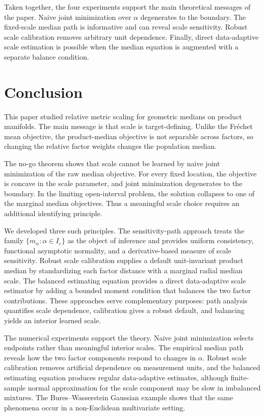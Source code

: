 \documentclass[11pt]{article}
\newcommand{\eps}{\varepsilon}
\newcommand{\1}{\mathbf{1}}
\begin{document}
Taken together, the four experiments support the main theoretical messages of
the paper.  Naive joint minimization over $\alpha$ degenerates to the boundary.
The fixed-scale median path is informative and can reveal scale sensitivity.
Robust scale calibration removes arbitrary unit dependence.  Finally, direct
data-adaptive scale estimation is possible when the median equation is
augmented with a separate balance condition.

\section{Conclusion}\label{sec:conclusion}

This paper studied relative metric scaling for geometric medians on product
manifolds.  The main message is that scale is target-defining.  Unlike the
Fr\'echet mean objective, the product-median objective is not separable across
factors, so changing the relative factor weights changes the population median.

The no-go theorem shows that scale cannot be learned by naive joint minimization
of the raw median objective.  For every fixed location, the objective is concave
in the scale parameter, and joint minimization degenerates to the boundary.  In
the limiting open-interval problem, the solution collapses to one of the
marginal median objectives.  Thus a meaningful scale choice requires an
additional identifying principle.

We developed three such principles.  The sensitivity-path approach treats the
family $\{m_\alpha:\alpha\in I_\eps\}$ as the object of inference and provides
uniform consistency, functional asymptotic normality, and a derivative-based
measure of scale sensitivity.  Robust scale calibration supplies a default
unit-invariant product median by standardizing each factor distance with a
marginal radial median scale.  The balanced estimating equation provides a
direct data-adaptive scale estimator by adding a bounded moment condition that
balances the two factor contributions.  These approaches serve complementary
purposes: path analysis quantifies scale dependence, calibration gives a robust
default, and balancing yields an interior learned scale.

The numerical experiments support the theory.  Naive joint minimization selects
endpoints rather than meaningful interior scales.  The empirical median path
reveals how the two factor components respond to changes in $\alpha$.  Robust
scale calibration removes artificial dependence on measurement units, and the
balanced estimating equation produces regular data-adaptive estimates, although
finite-sample normal approximation for the scale component may be slow in
imbalanced mixtures.  The Bures--Wasserstein Gaussian example shows that the
same phenomena occur in a non-Euclidean multivariate setting.
\end{document}
